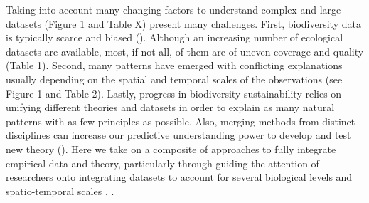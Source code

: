 \documentclass[12pt,a4paper]{article}
\begin{document}

Taking into account many changing factors to understand complex and large datasets (Figure 1 and Table X) present many challenges. First, biodiversity data is typically scarce and biased (\citep{hortal2015seven}). Although an increasing number of ecological datasets are available, most, if not all, of them are of uneven coverage and quality (Table 1). Second, many patterns have emerged with conflicting explanations usually depending on the spatial and temporal scales of the observations (see Figure 1 and Table 2). Lastly, progress in biodiversity sustainability relies on unifying different theories and datasets in order to explain as many natural patterns with as few principles as possible. Also, merging methods from distinct disciplines can increase our predictive understanding power to develop and test new theory (\citep{reichstein2019deep}). Here we take on a composite of approaches to fully integrate empirical data and theory, particularly through guiding the attention of researchers onto integrating datasets to account for several biological levels and spatio-temporal scales \citep{melian2018deciphering}, \citep{poisot2019data}.
\end{document}
